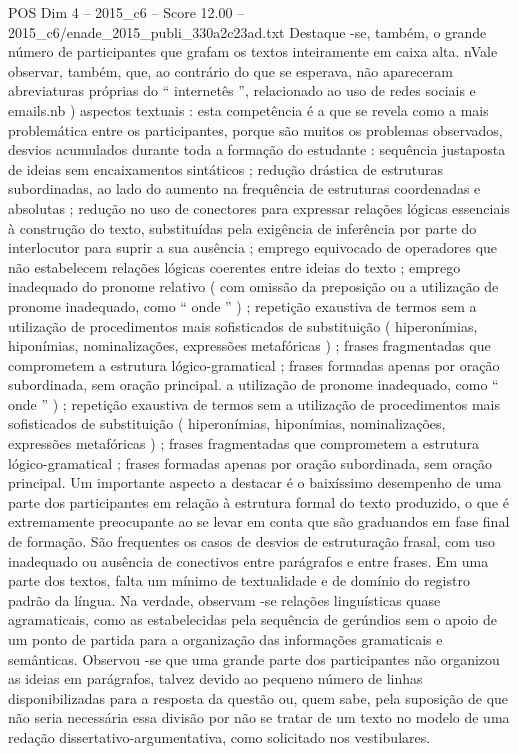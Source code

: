 \begin{textsample}{POS Dim 4 – 2015\_c6 – Score 12.00 – 2015\_c6/enade\_2015\_publi\_330a2c23ad.txt}
Destaque -se, também, o grande número de participantes que grafam os textos inteiramente em caixa alta. nVale observar, também, que, ao contrário do que se esperava, não apareceram abreviaturas próprias do “ internetês ”, relacionado ao uso de redes sociais e emails.nb ) aspectos textuais : esta competência é a que se revela como a mais problemática entre os participantes, porque são muitos os problemas observados, desvios acumulados durante toda a formação do estudante : sequência justaposta de ideias sem encaixamentos sintáticos ; redução drástica de estruturas subordinadas, ao lado do aumento na frequência de estruturas coordenadas e absolutas ; redução no uso de conectores para expressar relações lógicas essenciais à construção do texto, substituídas pela exigência de inferência por parte do interlocutor para suprir a sua ausência ; emprego equivocado de operadores que não estabelecem relações lógicas coerentes entre ideias do texto ; emprego inadequado do pronome relativo ( com omissão da preposição ou a utilização de pronome inadequado, como “ onde ” ) ; repetição exaustiva de termos sem a utilização de procedimentos mais sofisticados de substituição ( hiperonímias, hiponímias, nominalizações, expressões metafóricas ) ; frases fragmentadas que comprometem a estrutura lógico-gramatical ; frases formadas apenas por oração subordinada, sem oração principal. a utilização de pronome inadequado, como “ onde ” ) ; repetição exaustiva de termos sem a utilização de procedimentos mais sofisticados de substituição ( hiperonímias, hiponímias, nominalizações, expressões metafóricas ) ; frases fragmentadas que comprometem a estrutura lógico-gramatical ; frases formadas apenas por oração subordinada, sem oração principal.
Um importante aspecto a destacar é o baixíssimo desempenho de uma parte dos participantes em relação à estrutura formal do texto produzido, o que é extremamente preocupante ao se levar em conta que são graduandos em fase final de formação.
São frequentes os casos de desvios de estruturação frasal, com uso inadequado ou ausência de conectivos entre parágrafos e entre frases.
Em uma parte dos textos, falta um mínimo de textualidade e de domínio do registro padrão da língua.
Na verdade, observam -se relações linguísticas quase agramaticais, como as estabelecidas pela sequência de gerúndios sem o apoio de um ponto de partida para a organização das informações gramaticais e semânticas.
Observou -se que uma grande parte dos participantes não organizou as ideias em parágrafos, talvez devido ao pequeno número de linhas disponibilizadas para a resposta da questão ou, quem sabe, pela suposição de que não seria necessária essa divisão por não se tratar de um texto no modelo de uma redação dissertativo-argumentativa, como solicitado nos vestibulares.

\end{textsample}
